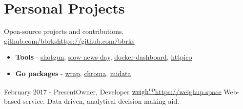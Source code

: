 \documentclass[11pt,a4paper]{moderncv}
\newcommand\styledhref[2]{\uline{\href{#1}{#2}}}
\newcommand\styledurl[1]{\uline{\url{#1}}}
\begin{document}
	\section{Personal Projects}
		\cventry
			{}{Open-source projects and contributions.}
			{\href{https://github.com/bbrks}{github.com/bbrks}}{\styledurl{https://github.com/bbrks}}
			{}{\begin{itemize}
				\item \textbf{Tools} -
					\styledhref{https://github.com/bbrks/shotgun}{shotgun},
					\styledhref{https://github.com/bbrks/slow-news-day}{slow-news-day},
					\styledhref{https://github.com/bbrks/docker-dashboard}{docker-dashboard},
					\styledhref{https://github.com/bbrks/httpico}{httpico}
				\item \textbf{Go packages} -
					\styledhref{https://github.com/bbrks/wrap}{wrap},
					\styledhref{https://github.com/bbrks/chroma}{chroma},
					\styledhref{https://github.com/bbrks/midata}{midata}
			\end{itemize}}
		\vspace{.25em}
		\cventry
			{February 2017 - Present}{Owner, Developer}
			{\href{https://weighup.space}{weigh\textsuperscript{up}}}{\styledurl{https://weighup.space}}
			{}{Web-based service. Data-driven, analytical decision-making aid. \\
			}
			
\end{document}
